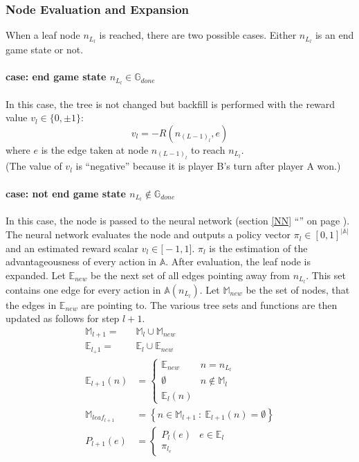 \documentclass[12pt]{article}
\newcommand{\sectionref}[1]{section \ref{#1} ``\nameref{#1}'' on page \pageref{#1}}
\begin{document}
\subsubsection{Node Evaluation and Expansion}
\label{sec:Methods:MCTS:Node Evaluation and Expansion}
When a leaf node \(n_{L_l}\) is reached, there are two possible cases. Either \(n_{L_l}\) is an end game state or not.
\paragraph*{case: end game state \(n_{L_l} \in \mathbb G_{done}\)}
In this case, the tree is not changed but backfill is performed with the reward value \(v_l \in \{0, \pm 1\}\):
\begin{equation}
v_l = -R(n_{(L-1)_l}, e)
\end{equation}
where \(e\) is the edge taken at node \(n_{(L-1)_l}\) to reach \(n_{L_l}\). \\
(The value of \(v_l\) is ``negative'' because it is player B's turn after player A won.)

\paragraph*{case: not end game state \(n_{L_l} \not\in \mathbb G_{done}\)}
In this case, the node is passed to the neural network (\sectionref{NN}). The neural network evaluates the node and outputs a policy vector \(\pi_l \in [0,1]^{|\mathbb A|}\) and an estimated reward scalar \(v_l \in \mathbb [-1,1]\). \(\pi_l\) is the estimation of the advantageousness of every action in \(\mathbb A\). After evaluation, the leaf node is expanded.
Let \(\mathbb E_{new}\) be the next set of all edges pointing away from \(n_{L_l}\). This set contains one edge for every action in \(\mathbb A(n_{L_l})\).
Let \(\mathbb M_{new}\) be the set of nodes, that the edges in \(\mathbb E_{new}\) are pointing to.
The various tree sets and functions are then updated as follows for step \(l+1\).
\begin{align}
\mathbb M_{l+1}   =& \mathbb M_l \cup \mathbb M_{new} \\
\mathbb E_{l_+1}  =& \mathbb E_l  \cup \mathbb E_{new} \\
%
\mathbb E_{l+1}(n) &= 
\left\{
\begin{matrix}
\mathbb E_{new} & n = n_{L_l}\\
\emptyset & n \not\in\mathbb M_l\\
\mathbb E_l(n)
\end{matrix}
\right.\\
%
\mathbb M_{leaf_{l+1}} &= \left\{n\in\mathbb M_{l+1}~:~\mathbb E_{l+1}(n) = \emptyset\right\}\\
%
P_{l+1}(e) &= 
\left\{
\begin{matrix}
P_l (e) & e \in\mathbb E_l\\
\pi_{l_e}&
\end{matrix}
\right.
\end{align}
\end{document}

